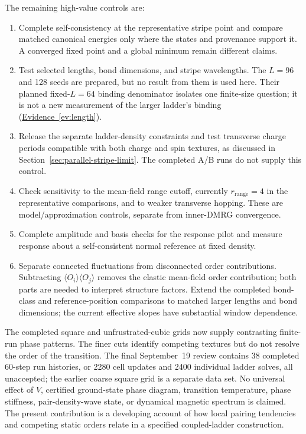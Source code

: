 \documentclass[11pt,letterpaper]{article}
\newcommand{\avg}[1]{\langle #1\rangle}
\newcommand{\ev}[1]{\hyperref[ev:#1]{Evidence~\ref*{ev:#1}}}
\begin{document}
The remaining high-value controls are:
\begin{enumerate}
 \item Complete self-consistency at the representative stripe point and
 compare matched canonical energies only where the states and provenance
 support it. A converged fixed point and a global minimum remain different
 claims.
 \item Test selected lengths, bond dimensions, and stripe wavelengths.
 The $L=96$ and 128 seeds are prepared, but no result from them is used here.
 Their planned fixed-$L=64$ binding denominator isolates one finite-size
 question; it is not a new measurement of the larger ladder's binding
 (\ev{length}).
 \item Release the separate ladder-density constraints and test transverse
 charge periods compatible with both charge and spin textures, as discussed
 in Section~\ref{sec:parallel-stripe-limit}. The completed A/B runs do not
 supply this control.
 \item Check sensitivity to the mean-field range cutoff, currently
 $r_{\mathrm{range}}=4$ in the representative comparisons, and to weaker
 transverse hopping. These are model/approximation controls, separate from
 inner-DMRG convergence.
 \item Complete amplitude and basis checks for the response pilot and measure
 response about a self-consistent normal reference at fixed density.
 \item Separate connected fluctuations from disconnected order contributions.
 Subtracting $\avg{O_i}\avg{O_j}$ removes the elastic mean-field order
 contribution; both parts are needed to interpret structure factors.
 Extend the completed bond-class and reference-position comparisons to
 matched larger lengths and bond dimensions; the current effective slopes
 have substantial window dependence.
\end{enumerate}

The completed square and unfrustrated-cubic grids now supply contrasting
finite-run phase patterns. The finer cuts identify competing textures but
do not resolve the order of the transition. The final September~19 review
contains 38 completed 60-step run histories, or 2280 cell updates and
2400 individual ladder solves, all unaccepted;
the earlier coarse square grid is a separate data set. No universal effect
of $V$, certified ground-state phase diagram, transition
temperature, phase stiffness, pair-density-wave state, or dynamical magnetic
spectrum is claimed. The present contribution is a developing account of
how local pairing tendencies and competing static orders relate in a
specified coupled-ladder construction.
\end{document}
